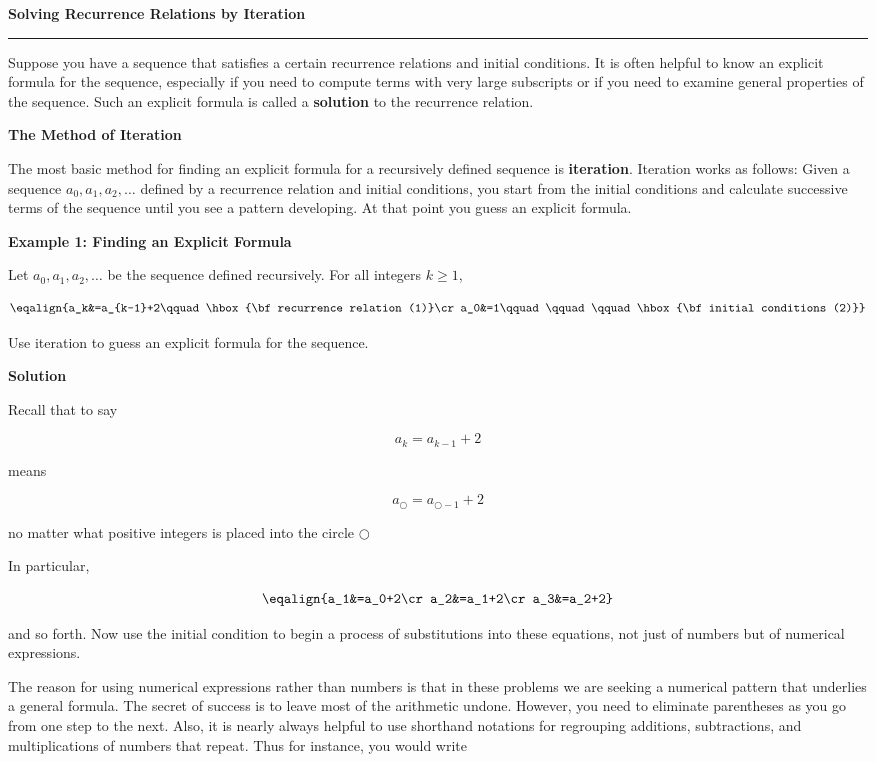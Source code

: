 {\bf Solving Recurrence Relations by Iteration}
\vskip 1mm
\hrule

\vskip 1cm
Suppose you have a sequence that satisfies a certain recurrence relations and initial conditions. It is often helpful to know an explicit formula for the sequence, especially if you need to compute terms with very large subscripts or if you need to examine general properties of the sequence. Such an explicit formula is called a {\bf solution} to the recurrence relation.

\vskip 1cm
{\bf The Method of Iteration}

\vskip 1mm
The most basic method for finding an explicit formula for a recursively defined sequence is {\bf iteration}. Iteration works as follows: Given a sequence $a_0,a_1,a_2,\ldots$ defined by a recurrence relation and initial conditions, you start from the initial conditions and calculate successive terms of the sequence until you see a pattern developing. At that point you guess an explicit formula.

\vskip 1cm
{\bf Example 1: Finding an Explicit Formula}

\vskip 1mm
Let $a_0,a_1,a_2,\ldots$ be the sequence defined recursively. For all integers $k\geq 1$,

$$\eqalign{a_k&=a_{k-1}+2\qquad\hbox{\bf recurrence relation (1)}\cr
	a_0&=1\qquad\qquad\qquad\hbox{\bf initial conditions (2)}}$$

Use iteration to guess an explicit formula for the sequence.

\vskip 3mm
{\bf Solution}

\vskip 1mm
Recall that to say

$$a_k=a_{k-1}+2$$

means

$$a_\bigcirc=a_{\bigcirc-1}+2$$

no matter what positive integers is placed into the circle $\bigcirc$

\vskip 1mm
In particular,

$$\eqalign{a_1&=a_0+2\cr
	a_2&=a_1+2\cr
	a_3&=a_2+2}$$

and so forth. Now use the initial condition to begin a process of substitutions into these equations, not just of numbers but of numerical expressions.

\vskip 1mm
The reason for using numerical expressions rather than numbers is that in these problems we are seeking a numerical pattern that underlies a general formula. The secret of success is to leave most of the arithmetic undone. However, you need to eliminate parentheses as you go from one step to the next. Also, it is nearly always helpful to use shorthand notations for regrouping additions, subtractions, and multiplications of numbers that repeat. Thus for instance, you would write

